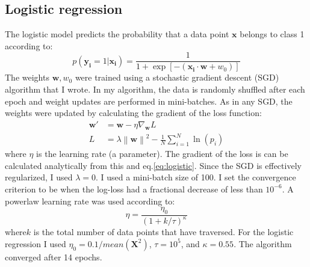 \documentclass{article} %
\newcommand{\norm}[1]{\left\lVert#1\right\rVert}
\newcommand{\vect}[1]{\mathbf{#1}}
\newcommand{\mat}[1]{\mathbf{#1}}
\begin{document}

\subsection{Logistic regression}
\label{model:logistic}
The logistic model predicts the probability that a data point $\vect{x}$ belongs to class 1 according to:
\begin{equation}
\label{eq:logistic}
p(\vect{y_i}=1 | \vect{x_i}) = \frac{1}{1 + \exp[-(\vect{x_i}\cdot\vect{w} + w_0)]}
\end{equation}
The weights $\vect{w}, w_0$ were trained using a stochastic gradient descent (SGD) algorithm that I wrote.  In my algorithm, the data is randomly shuffled after each epoch and weight updates are performed in mini-batches.  As in any SGD, the weights were updated by calculating the gradient of the loss function:
\begin{align}
\label{eq:sgd_weight_update}
\vect{w'} &= \vect{w} - \eta \nabla_{\vect{w}} L \\
\label{eq:logistic_loss}
L &= \lambda \norm{\vect{w}}^2 -\frac{1}{N}\sum_{i=1}^{N} \ln(p_i)
\end{align}
where $\eta$ is the learning rate (a parameter). The gradient of the loss is can be calculated analytically from this and eq.\ref{eq:logistic}.
Since the SGD is effectively regularized, I used $\lambda=0$.  I used a mini-batch size of 100.  I set the convergence criterion to be when the log-loss had a fractional decrease of less than $10^{-6}$.  A powerlaw learning rate was used according to:
\begin{equation}
\label{eq:learning_rate}
\eta = \frac{\eta_0}{(1 + k/\tau)^\kappa}
\end{equation}
where$k$ is the total number of data points that have traversed.  For the logistic regression I used $\eta_0 = 0.1/mean(\mat{X}^2)$, $\tau = 10^5$, and $\kappa = 0.55$.  The algorithm converged after 14 epochs.
\end{document}
